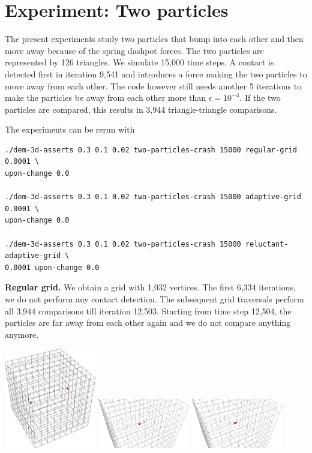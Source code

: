 \section{Experiment: Two particles}
\label{section:experiment:two-particles}

The present experiments study two particles that bump into each other and then
move away because of the spring dashpot forces.
The two particles are represented by 126 triangles. 
We simulate 15,000 time steps.
A contact is detected first in iteration 9,541 and introduces a force making the
two particles to move away from each other. 
The code however still needs another 5 iterations to make the particles be away
from each other more than $\epsilon=10^{-4}$.
If the two particles are compared, this results in 3,944 triangle-triangle
comparisons.
 
The experiments can be rerun with 
{\footnotesize
\begin{verbatim}
./dem-3d-asserts 0.3 0.1 0.02 two-particles-crash 15000 regular-grid 0.0001 \ 
upon-change 0.0

./dem-3d-asserts 0.3 0.1 0.02 two-particles-crash 15000 adaptive-grid 0.0001 \
upon-change 0.0

./dem-3d-asserts 0.3 0.1 0.02 two-particles-crash 15000 reluctant-adaptive-grid \
0.0001 upon-change 0.0
\end{verbatim}
}

{\bf Regular grid.} We obtain a grid with 1,032 vertices. The first 6,334
iterations, we do not perform any contact detection. The subsequent grid
traversals perform all 3,944 comparisons till iteration 12,503. Starting from
time step 12,504, the particles are far away from each other again and we do not
compare anything anymore.

\begin{center}
  \includegraphics[width=0.3\textwidth]{experiments/two-bodies/visualisation/regular-grid00.png}
  \includegraphics[width=0.3\textwidth]{experiments/two-bodies/visualisation/regular-grid01.png}
  \includegraphics[width=0.3\textwidth]{experiments/two-bodies/visualisation/regular-grid02.png}
\end{center}


